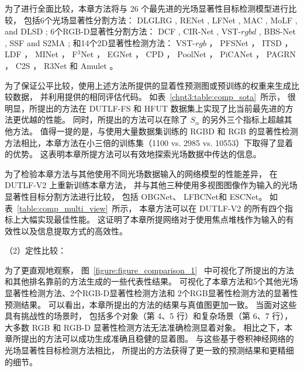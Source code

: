 为了进行全面比较，本章方法将与 26 个最先进的光场显著性目标检测模型进行比较，
包括6个光场显著性分割方法：
DLGLRG , RENet , LFNet ,
MAC , MoLF , and DLSD ;
%
%
%
%
6个RGB-D显著性分割方法：
DCF , CIR-Net , VST-$rgbd$  ,
BBS-Net     , SSF      and S2MA    ;
%
%
%
%
%
和14个2D显著性检测方法：
VST-$rgb$ ，
PFSNet ，
ITSD ，
LDF ，
MINet ，
F$^{3}$Net  ， 
EGNet   ，
CPD  ，
PoolNet ，
PiCANet ，
PAGRN ，
C2S   ，
R3Net  
和
Amulet 。






为了保证公平比较，使用上述方法所提供的显着性预测图或预训练的权重来生成比较数据，
并利用提供的相同评估代码。
如表~\ref{chpt3:table:comp_sota}~所示，
很明显，所提出的方法在 DUTLF-FS 和 HFUT 数据集上实现了比当前最先进的方法更优越的性能。 同时，所提出的方法可以在除了 $ S_{\alpha} $ 的另外三个指标上超越其他方法。 值得一提的是，与使用大量数据集训练的 RGBD 和 RGB 的显著性检测方法相比，本章方法在小三倍的训练集（1100 vs. 2985 vs. 10553）下取得了显着的优势。 
这表明本章所提方法可以有效地探索光场数据中传达的信息。 



为了检验本章方法与其他使用不同光场数据输入的网络模型的性能差异，
在 DUTLF-V2 上重新训练本章方法，
并与其他三种使用多视图图像作为输入的光场显著性目标分割方法进行比较，
包括 OBGNet、
LFBCNet和
ESCNet。 
如表~\ref{table:comp_multi_view}~所示，
本章方法可以在 DUTLF-V2 的所有四个指标上大幅实现最佳性能。 
这证明了本章所提网络对于使用焦点堆栈作为输入的有效性以及信息提取方式的高效性。 






（2）定性比较：


为了更直观地观察，
图~\ref{figure:figure_comparison_1}~
中可视化了所提出的方法和其他排名靠前的方法生成的一些代表性结果。
可视化了本章方法和5个其他光场显著性检测方法、2个RGB-D显著性检测方法和
2个RGB显著性检测方法的显著性预测结果。
可以看出，本章所提出的方法的结果与真值图更加一致。 
当面对这些具有挑战性的场景时，
包括多个对象（第 4、5 行）和复杂场景（第 6、7 行），
大多数 RGB 和 RGB-D 显著性检测方法无法准确检测显着对象。
相比之下，本章所提出的方法可以成功生成准确且稳健的显着图。
与这些基于卷积神经网络的光场显著性目标检测方法相比，
所提出的方法获得了更一致的预测结果和更精细的细节。




